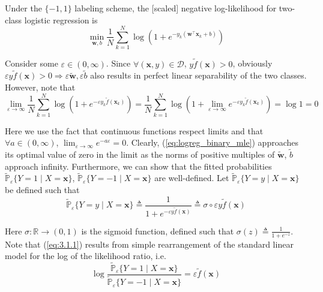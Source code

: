 \documentclass{article}
\numberwithin{equation}{section}
\begin{document}
\medskip

Under the $ \{-1, 1\} $ labeling scheme, the [scaled] negative log-likelihood
for two-class logistic regression is
\begin{equation} \label{eq:logreg_binary_mle}
    \min_{\mathbf{w}, b}\frac{1}{N}\sum_{k = 1}^N\log\left(
        1 + e^{-y_k\left(\mathbf{w}^\top\mathbf{x}_k + b\right)}
    \right)
\end{equation}

Consider some $ \varepsilon \in (0, \infty) $. Since
$ \forall (\mathbf{x}, y) \in \mathcal{D} $, $ y\tilde{f}(\mathbf{x}) > 0 $,
obviously $ \varepsilon y\tilde{f}(\mathbf{x}) > 0 \Rightarrow
\varepsilon\tilde{\mathbf{w}}, \varepsilon\tilde{b} $ also results in perfect
linear separability of the two classes. However, note that
\begin{equation*}
    \lim_{\varepsilon \rightarrow \infty}\frac{1}{N}\sum_{k = 1}^N\log\left(
        1 + e^{-\varepsilon y_k\tilde{f}(\mathbf{x}_k)}
    \right) =
    \frac{1}{N}\sum_{k = 1}^N\log\left(
        1 + \lim_{\varepsilon \rightarrow \infty}
        e^{-\varepsilon y_k\tilde{f}(\mathbf{x}_k)}
    \right) =
    \log 1 = 0
\end{equation*}

Here we use the fact that continuous functions respect limits and that
$ \forall a \in (0, \infty) $,
$ \lim_{\varepsilon \rightarrow \infty}e^{-a\varepsilon} = 0 $. Clearly,
(\ref{eq:logreg_binary_mle}) approaches its optimal value of zero in the
limit as the norms of positive multiples of $ \tilde{\mathbf{w}} $,
$ \tilde{b} $ approach infinity. Furthermore, we can show that the fitted
probabilities $ \tilde{\mathbb{P}}_\varepsilon\{Y = 1 \mid X = \mathbf{x}\} $,
$ \tilde{\mathbb{P}}_\varepsilon\{Y = -1 \mid X = \mathbf{x}\} $ are
well-defined. Let $ \tilde{\mathbb{P}}_\varepsilon
\{Y = y \mid X = \mathbf{x}\} $ be defined such that
\begin{equation} \label{eq:3.1.1}
    \tilde{\mathbb{P}}_\varepsilon\{Y = y \mid X = \mathbf{x}\} \triangleq
    \frac{1}{1 + e^{-\varepsilon y\tilde{f}(\mathbf{x})}} \triangleq
    \sigma\circ\varepsilon y\tilde{f}(\mathbf{x})
\end{equation}

Here $ \sigma : \mathbb{R} \rightarrow (0, 1) $ is the sigmoid function,
defined such that $ \sigma(z) \triangleq \frac{1}{1 + e^{-z}} $. Note that
(\ref{eq:3.1.1}) results from simple rearrangement of the standard linear
model for the log of the likelihood ratio, i.e.
\begin{equation*}
    \log\frac{
        \tilde{\mathbb{P}}_\varepsilon\{Y = 1 \mid X = \mathbf{x}\}
    }{
        \tilde{\mathbb{P}}_\varepsilon\{Y = -1 \mid X = \mathbf{x}\}
    } =
    \varepsilon\tilde{f}(\mathbf{x})
\end{equation*}
\end{document}

